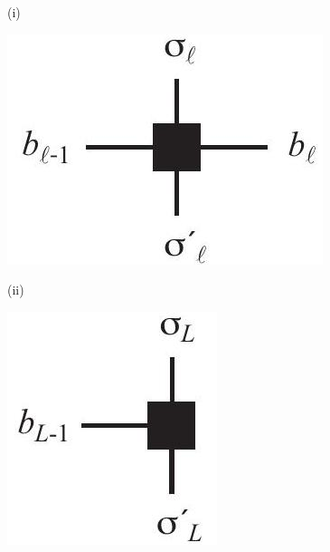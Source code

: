 \documentclass[12pt]{article}
\begin{document}
(i)

\begin{center}
\includegraphics[max width=\textwidth]{2024_05_04_afc4ad226da9ccfe0ac8g-057(1)}
\end{center}

(ii)

\begin{center}
\includegraphics[max width=\textwidth]{2024_05_04_afc4ad226da9ccfe0ac8g-057(3)}
\end{center}
\end{document}
